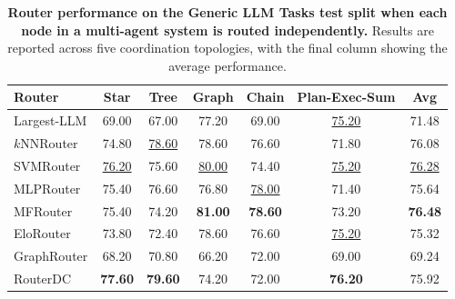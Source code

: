 \begin{table}[t]
\centering
\caption{\textbf{Router performance on the Generic LLM Tasks test split when each node in a multi-agent system is routed independently.} Results are reported across five coordination topologies, with the final column showing the average performance.}
\label{tab:mas}
\small
\setlength{\tabcolsep}{6pt}
\begin{tabular}{lcccccc}
\toprule
\textbf{Router} & \textbf{Star} & \textbf{Tree} & \textbf{Graph} & \textbf{Chain} & \textbf{Plan-Exec-Sum} & \textbf{Avg} \\
\midrule
Largest-LLM & 69.00 & 67.00 & 77.20 & 69.00 & \underline{75.20} & 71.48 \\
\midrule
$k$NNRouter & 74.80 & \underline{78.60} & 78.60 & 76.60 & 71.80 & 76.08 \\
SVMRouter & \underline{76.20} & 75.60 & \underline{80.00} & 74.40 & \underline{75.20} & \underline{76.28} \\
MLPRouter & 75.40 & 76.60 & 76.80 & \underline{78.00} & 71.40 & 75.64 \\
MFRouter & 75.40 & 74.20 & \textbf{81.00} & \textbf{78.60} & 73.20 & \textbf{76.48} \\
EloRouter & 73.80 & 72.40 & 78.60 & 76.60 & \underline{75.20} & 75.32 \\
GraphRouter & 68.20 & 70.80 & 66.20 & 72.00 & 69.00 & 69.24 \\
RouterDC & \textbf{77.60} & \textbf{79.60} & 74.20 & 72.00 & \textbf{76.20} & 75.92 \\
\bottomrule
\end{tabular}
\vspace{-10pt}
\end{table}